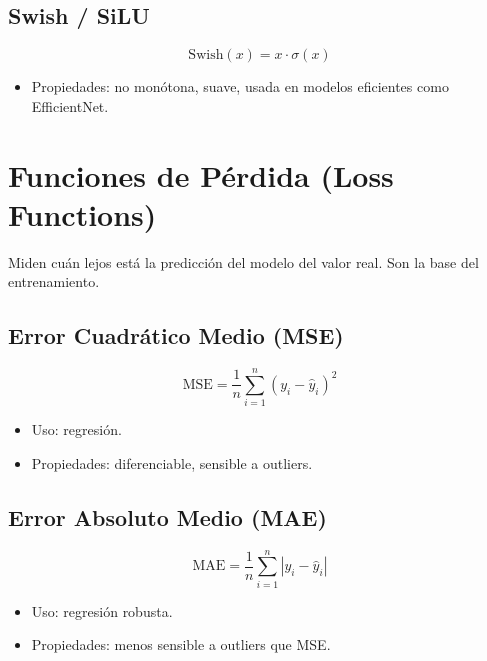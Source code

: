 \documentclass[12pt,a4paper,openany,oneside]{book}
\begin{document}
\subsection{Swish / SiLU}
\begin{equation*}
\text{Swish}(x) = x \cdot \sigma(x)
\end{equation*}
\begin{itemize}
    \item Propiedades: no monótona, suave, usada en modelos eficientes como EfficientNet.
\end{itemize}

\begin{center}
\end{center}

\section{Funciones de Pérdida (Loss Functions)}
Miden cuán lejos está la predicción del modelo del valor real. Son la base del entrenamiento.

\subsection{Error Cuadrático Medio (MSE)}
\begin{equation*}
\text{MSE} = \frac{1}{n}\sum_{i=1}^{n} (y_i - \hat{y}_i)^2
\end{equation*}
\begin{itemize}
    \item Uso: regresión.
    \item Propiedades: diferenciable, sensible a outliers.
\end{itemize}

\subsection{Error Absoluto Medio (MAE)}
\begin{equation*}
\text{MAE} = \frac{1}{n}\sum_{i=1}^{n} |y_i - \hat{y}_i|
\end{equation*}
\begin{itemize}
    \item Uso: regresión robusta.
    \item Propiedades: menos sensible a outliers que MSE.
\end{itemize}
\end{document}
